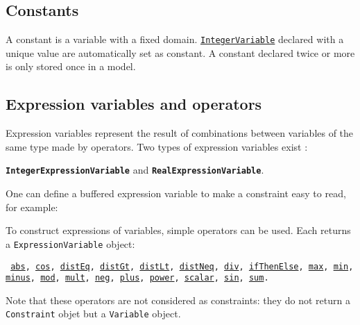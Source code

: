 \subsection{Constants}\label{model:constants}\hypertarget{model:constants}{}
A constant is a variable with a fixed domain. \hyperlink{integervariable}{\tt IntegerVariable} declared with a unique value are automatically set as constant. A constant declared twice or more is only stored once in a model.



\subsection{Expression variables and operators}\label{model:expressionvariables}\hypertarget{model:expressionvariables}{}
Expression variables represent the result of combinations between variables of the same type made by operators. Two types of expression variables exist : 
\begin{notedef}
\textbf{\tt IntegerExpressionVariable} and \textbf{\tt RealExpressionVariable}.
\end{notedef}
One can define a buffered expression variable to make a constraint easy to read, for example:



To construct expressions of variables, simple operators can be used. Each returns a \texttt{ExpressionVariable} object:
\begin{notedef}\tt
\hyperlink{abs:absoperator}{abs}, \hyperlink{cos:cosoperator}{cos}, \hyperlink{disteq:disteqoperator}{distEq}, \hyperlink{distgt:distgtoperator}{distGt}, \hyperlink{distlt:distltoperator}{distLt}, \hyperlink{distneq:distneqoperator}{distNeq}, \hyperlink{div:divoperator}{div}, \hyperlink{ifthenelse:ifthenelseoperator}{ifThenElse}, \hyperlink{max:maxoperator}{max}, \hyperlink{min:minoperator}{min}, \hyperlink{minus:minusoperator}{minus}, \hyperlink{mod:modoperator}{mod}, \hyperlink{mult:multoperator}{mult}, \hyperlink{neg:negoperator}{neg}, \hyperlink{plus:plusoperator}{plus}, \hyperlink{power:poweroperator}{power}, \hyperlink{scalar:scalaroperator}{scalar}, \hyperlink{sin:sinoperator}{sin}, \hyperlink{sum:sumoperator}{sum}.
\end{notedef}
Note that these operators are not considered as constraints: they do not return a \texttt{Constraint} objet but a \texttt{Variable} object.


